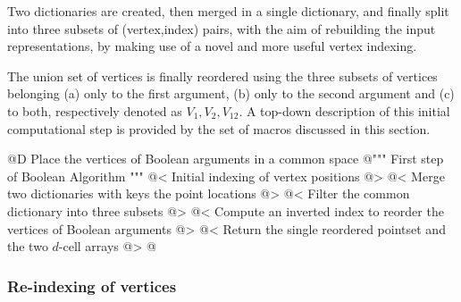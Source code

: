 \documentclass[11pt,oneside]{article}	%
\begin{document}
Two dictionaries are created, then merged in a single dictionary, and finally split into three subsets of (vertex,index) pairs, with the aim of rebuilding the input representations, by making use of a novel and more useful vertex indexing.

The union set of vertices is finally reordered using the three subsets of vertices belonging (a) only to the first argument, (b) only to the second argument and (c) to both, respectively denoted as $V_1, V_2, V_{12}$. A top-down description of this initial computational step is provided by the set of macros discussed in this section.

@D Place the vertices of Boolean arguments in a common space
@{""" First step of Boolean Algorithm """
@< Initial indexing of vertex positions @>
@< Merge two dictionaries with keys the point locations @>
@< Filter the common dictionary into three subsets @>
@< Compute an inverted index to reorder the vertices of Boolean arguments @>
@< Return the single reordered pointset and the two $d$-cell arrays @>
@}

\subsubsection{Re-indexing of vertices}
\end{document}
